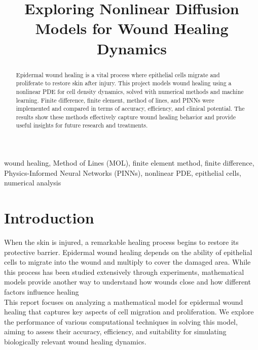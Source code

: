 \documentclass[conference]{IEEEtran}
\begin{document}
\title{Exploring Nonlinear Diffusion Models for Wound Healing Dynamics}

\author{
}



\maketitle

\begin{abstract}
Epidermal wound healing is a vital process where epithelial cells migrate and proliferate to restore skin after injury. This project models wound healing using a nonlinear PDE for cell density dynamics, solved with numerical methods and machine learning. Finite difference, finite element, method of lines, and PINNs were implemented and compared in terms of accuracy, efficiency, and clinical potential. The results show these methods effectively capture wound healing behavior and provide useful insights for future research and treatments.
\end{abstract}

\begin{IEEEkeywords}
wound healing, Method of Lines (MOL), finite element method, finite difference,  Physics-Informed Neural Networks (PINNs), nonlinear PDE, epithelial cells, numerical analysis
\end{IEEEkeywords}

\section{Introduction}
When the skin is injured, a remarkable healing process begins to restore its protective barrier. Epidermal wound healing depends on the ability of epithelial cells to migrate into the wound and multiply to cover the damaged area. While this process has been studied extensively through experiments, mathematical models provide another way to understand how wounds close and how different factors influence healing\\
This report focuses on analyzing a mathematical model for epidermal wound healing that captures key aspects of cell migration and proliferation. We explore the performance of various computational techniques in solving this model, aiming to assess their accuracy, efficiency, and suitability for simulating biologically relevant wound healing dynamics.
\end{document}
